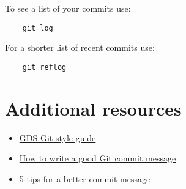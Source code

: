 To see a list of your commits use:

\begin{verbatim}
    git log
\end{verbatim}

For a shorter list of recent commits use:

\begin{verbatim}
    git reflog
\end{verbatim}


\section{Additional resources}

\begin{itemize}[leftmargin=*]
    \item \href{https://github.com/alphagov/styleguides/blob/master/git.md}{GDS Git style guide}
    \item \href{https://chris.beams.io/posts/git-commit/}{How to write a good Git commit message}
	\item \href{https://thoughtbot.com/blog/5-useful-tips-for-a-better-commit-message}{5 tips for a better commit message}
\end{itemize}

